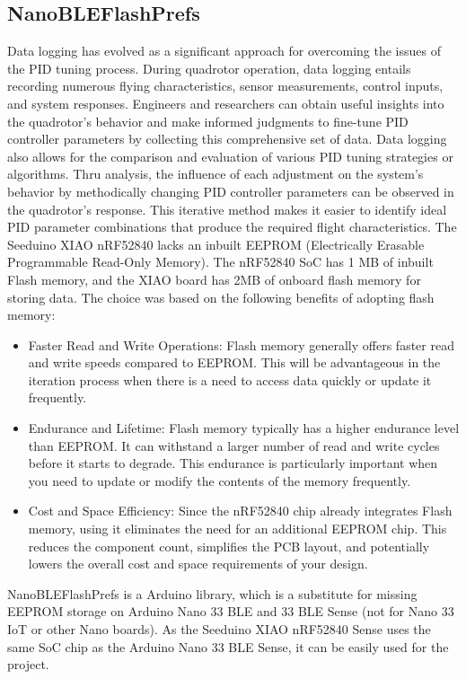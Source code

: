 \subsection{NanoBLEFlashPrefs}
Data logging has evolved as a significant approach for overcoming the issues of the PID tuning process. \cite{PIDlog}
During quadrotor operation, data logging entails recording numerous flying characteristics, sensor measurements, control inputs, and system responses.
Engineers and researchers can obtain useful insights into the quadrotor's behavior and make informed judgments to fine-tune PID controller parameters by collecting this comprehensive set of data. \cite{loggingProof}
Data logging also allows for the comparison and evaluation of various PID tuning strategies or algorithms. 
Thru analysis, the influence of each adjustment on the system's behavior by methodically changing PID controller parameters can be observed in the quadrotor's response.
This iterative method makes it easier to identify ideal PID parameter combinations that produce the required flight characteristics.
The Seeduino XIAO nRF52840 lacks an inbuilt EEPROM (Electrically Erasable Programmable Read-Only Memory). The nRF52840 SoC has 1 MB of inbuilt Flash memory, and the XIAO board has 2MB of onboard flash memory for storing data. The choice was based on the following benefits of adopting flash memory:
\begin{itemize}
    \item
        Faster Read and Write Operations: Flash memory generally offers faster read and write speeds compared to EEPROM. This will be advantageous in the iteration process when there is a need to access data quickly or update it frequently.
    \item
    	Endurance and Lifetime: Flash memory typically has a higher endurance level than EEPROM. It can withstand a larger number of read and write cycles before it starts to degrade. This endurance is particularly important when you need to update or modify the contents of the memory frequently.
    \item
    	Cost and Space Efficiency: Since the nRF52840 chip already integrates Flash memory, using it eliminates the need for an additional EEPROM chip. This reduces the component count, simplifies the PCB layout, and potentially lowers the overall cost and space requirements of your design.
\end{itemize}
NanoBLEFlashPrefs is a Arduino library, which is a substitute for missing EEPROM storage on Arduino Nano 33 BLE and 33 BLE Sense (not for Nano 33 IoT or other Nano boards). \cite{FlashPrefs}
As the Seeduino XIAO nRF52840 Sense uses the same SoC chip as the Arduino Nano 33 BLE Sense, it can be easily used for the project. \cite{Nano33} \cite{wikiSeeed}
